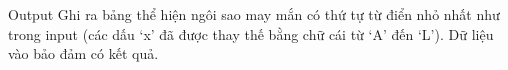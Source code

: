 Output
Ghi ra bảng thể hiện ngôi sao may mắn có thứ tự từ điển nhỏ nhất như trong input (các dấu ‘x’ đã được thay thế bằng chữ cái từ ‘A’ đến ‘L’). Dữ liệu vào bảo đảm có kết quả.